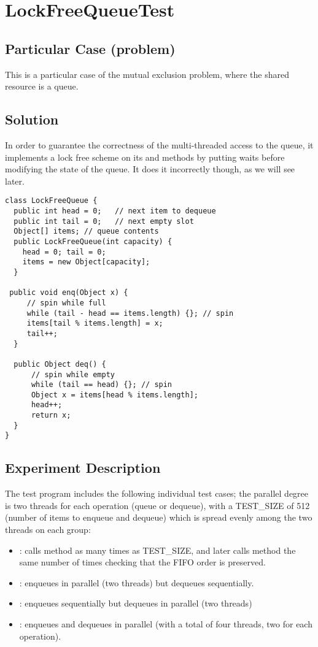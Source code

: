 \section{\textbf{LockFreeQueueTest}}

\subsection{Particular Case (problem)}
This is a particular case of the mutual exclusion problem, where the
shared resource is a queue.

\subsection{Solution}
In order to guarantee the correctness of
the multi-threaded access to the queue, it implements a lock free
scheme on its  and  methods by putting waits
before modifying the state of the queue. It does it incorrectly
though, as we will see later. \\

\begin{lstlisting}[style=numbers]
class LockFreeQueue {
  public int head = 0;   // next item to dequeue
  public int tail = 0;   // next empty slot
  Object[] items; // queue contents
  public LockFreeQueue(int capacity) {
    head = 0; tail = 0;
    items = new Object[capacity];
  }

 public void enq(Object x) {
     // spin while full
     while (tail - head == items.length) {}; // spin
     items[tail % items.length] = x;
     tail++;
  }

  public Object deq() {
      // spin while empty
      while (tail == head) {}; // spin
      Object x = items[head % items.length];
      head++;
      return x;
  }
}
\end{lstlisting}
\hfill

\subsection{Experiment Description}
The test program  includes the following individual
test cases; the parallel degree is two threads for each operation
(queue or dequeue), with a TEST\_SIZE of 512 (number of items to
enqueue and dequeue) which is spread evenly among the two threads on
each group:

\begin{itemize}
  \item {}: calls  method as many times as
    TEST\_SIZE, and later calls  method the same number of
    times checking that the FIFO order is preserved. 
  \item {}: enqueues in parallel (two threads) but dequeues
    sequentially.
  \item {}: enqueues sequentially but dequeues in
    parallel (two threads)
  \item {}: enqueues and dequeues in parallel (with
    a total of four threads, two for each operation).
\end{itemize}

